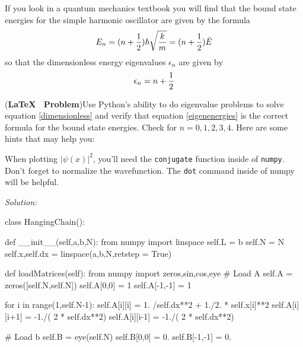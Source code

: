 If you look in a quantum mechanics textbook you will find that
the bound state energies for the simple harmonic oscillator are
given by the formula
\begin{equation}
    E_n = (n + {1 \over 2}) \hbar \sqrt{k \over m} =
    (n + {1 \over 2}) \bar{E}
\end{equation}
so that the dimensionless energy eigenvalues $\epsilon_n$ are given by
\begin{equation}\label{eigenenergies}
    \epsilon_n = n + {1 \over 2}
\end{equation}
\begin{enumerate}
\prob \label{H:12.4}
(\textbf{\LaTeX~ Problem})Use Python's ability to do eigenvalue problems to solve equation
\eqref{dimensionless} and verify that equation \eqref{eigenenergies} is
the correct formula for the bound state energies.  Check for $n=0,1,2,3,4$.
Here are some hints that may help you:
\begin{enumerate}
\subprob When plotting $|\psi(x)|^2$, you'll need the
\texttt{conjugate} function inside of \texttt{numpy}.
\subprob  Don't forget to normalize the wavefunction.  The
\texttt{dot} command inside of numpy will be helpful.
\end{enumerate}
\ifsolutions
\textit{Solution:}\\
\begin{codeexample}
\begin{VerbatimOut}{\listingFile}
class HangingChain():

    def __init__(self,a,b,N):
        from numpy import linspace
        self.L = b
        self.N = N
        self.x,self.dx = linspace(a,b,N,retstep = True)

    def loadMatrices(self):
        from numpy import zeros,sin,cos,eye
        # Load A
        self.A = zeros([self.N,self.N])
        self.A[0,0] = 1
        self.A[-1,-1] = 1

        for i in range(1,self.N-1):
            self.A[i][i] = 1. /self.dx**2 + 1./2. * self.x[i]**2
            self.A[i][i+1] = -1./( 2 * self.dx**2)
            self.A[i][i-1] = -1./( 2 * self.dx**2)

        # Load b
        self.B = eye(self.N)
        self.B[0,0] = 0.
        self.B[-1,-1] = 0.


\end{VerbatimOut}
\end{codeexample}
\end{enumerate}
